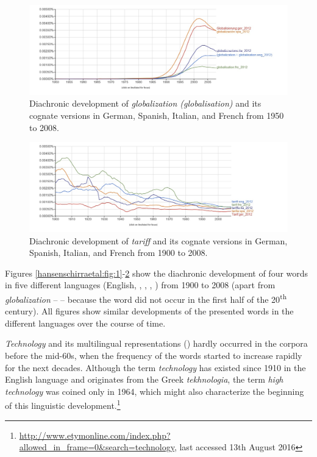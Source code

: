 \documentclass[output=paper]{LSP/langsci}
\begin{document}
\begin{figure}
\caption{Diachronic development of \textit{globalization (globalisation)} and its cognate versions in German, Spanish, Italian, and French from 1950 to 2008.}
\label{hansenschirraetal:fig:3}
\includegraphics[width=\textwidth]{figures/hansen-schirra/HansenSchirra3.jpg}
\end{figure}


\clearpage  

\begin{figure}
\caption{Diachronic development of \textit{tariff} and its cognate versions in German, Spanish, Italian, and French from 1900 to 2008.}
\label{hansenschirraetal:fig:4}
\includegraphics[width=\textwidth]{figures/hansen-schirra/HansenSchirra4.jpg}
\end{figure}


Figures \ref{hansenschirraetal:fig:1}-\ref{hansenschirraetal:fig:4} show the diachronic development of four  words in five different languages (English, , , , ) from 1900 to 2008 (apart from \textit{globalization} –  – because the word did not occur in the first half of the 20\textsuperscript{th} century). All figures show similar developments of the presented words in the different languages over the course of time.



\textit{Technology} and its multilingual  representations () hardly occurred in the corpora before the mid-60s, when the frequency of the words started to increase rapidly for the next decades. Although the term \textit{technology} has existed since 1910 in the English language and originates from the Greek \textit{tekhnologia}, the term \textit{high technology} was coined only in 1964, which might also characterize the beginning of this linguistic development.\footnote{\url{http://www.etymonline.com/index.php?allowed_in_frame=0&search=technology}, last accessed 13th August 2016}
\end{document}
